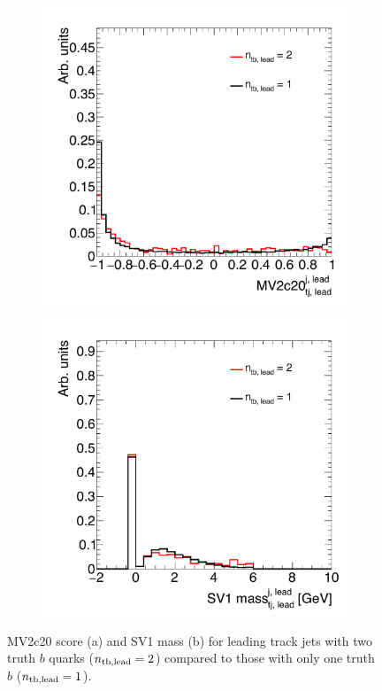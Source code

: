 \begin{figure}[t!]
   \begin{subfigure}[t]{0.5\textwidth}
        \centering
        \includegraphics[width=\textwidth]{figures/Ntb_MV2c20}
        \caption{}
    \end{subfigure}%
    \begin{subfigure}[t]{0.5\textwidth}
        \centering
        \includegraphics[width=\textwidth]{figures/Ntb_SV1mass}
        \caption{}
    \end{subfigure}

   \caption{MV2c20 score (a) and SV1 mass (b) for leading track jets with two truth $b$ quarks ($n_{\rm tb, lead} = 2$) compared to those with only one truth $b$ ($n_{\rm tb, lead} = 1$).}
  \label{fig:MV2_nb}
\end{figure}
